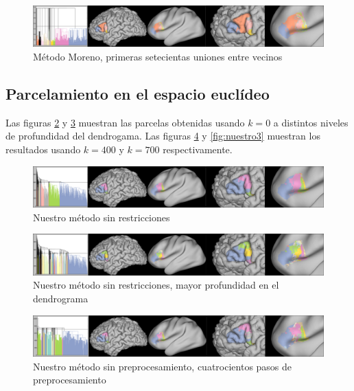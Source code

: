 \begin{figure}[h!]
    \includegraphics[width=\textwidth]{img/broca/moreno_750.png}
    \caption{M\'etodo Moreno, primeras setecientas uniones entre vecinos}
    \label{fig:moreno3}
\end{figure}

\clearpage

\subsection{Parcelamiento en el espacio eucl\'ideo}

Las figuras \ref{fig:nuestro0} y \ref{fig:nuestro1} muestran las parcelas obtenidas 
usando $k=0$ a distintos niveles de profundidad del dendrogama. Las figuras 
\ref{fig:nuestro2} y \ref{fig:nuestro3} muestran los resultados usando $k=400$ y
$k=700$ respectivamente.

\begin{figure}[h!]
    \includegraphics[width=\textwidth]{img/broca/logit_0.png}
    \caption{Nuestro m\'etodo sin restricciones}
    \label{fig:nuestro0}
\end{figure}
                                                                                                                        
\begin{figure}[h!]
    \includegraphics[width=\textwidth]{img/broca/logit_0_deep.png}
    \caption{Nuestro m\'etodo sin restricciones, mayor profundidad en el 
            dendrograma}
    \label{fig:nuestro1}
\end{figure}

\begin{figure}[h!]
    \includegraphics[width=\textwidth]{img/broca/logit_400.png}
    \caption{Nuestro m\'etodo sin preprocesamiento, cuatrocientos pasos de preprocesamiento}
    \label{fig:nuestro2}
\end{figure}

